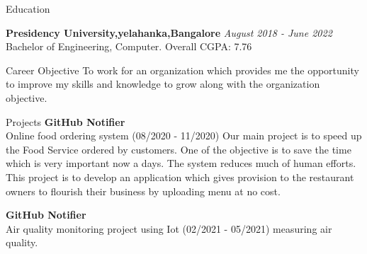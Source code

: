 \documentclass{resume}
\begin{document}
\begin{rSection}{Education}


{\bf Presidency University,yelahanka,Bangalore} \hfill {\em August 2018 - June 2022} 
\\ Bachelor of Engineering, Computer.\hfill { Overall CGPA: 7.76 }

\end{rSection}

\begin{rSection}{Career Objective}
 To work for an organization which provides me the opportunity to improve my skills and knowledge to grow along with the organization objective.
\end{rSection}

\begin{rSection}{Projects}
{\bf GitHub Notifier}
\\Online food ordering system (08/2020 - 11/2020)
Our main project is to speed up the Food Service ordered by customers. One of the objective is to save the time which is very important now a days. The system reduces much of human efforts. This project is to develop an application which gives provision to the restaurant owners to flourish their business by uploading menu at no cost.

{\bf GitHub Notifier}
\\Air quality monitoring project using Iot (02/2021 - 05/2021) 
measuring air quality.

\end{rSection}
\end{document}
